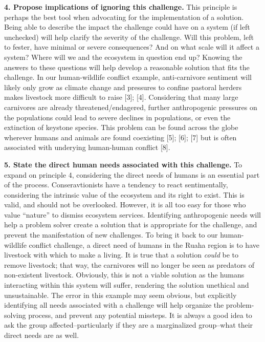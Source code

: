 \documentclass[10pt,letterpaper]{article}
\begin{document}
\textbf{4. Propose implications of ignoring this challenge.} This
principle is perhaps the best tool when advocating for the
implementation of a solution. Being able to describe the impact the
challenge could have on a system (if left unchecked) will help clarify
the severity of the challenge. Will this problem, left to fester, have
minimal or severe consequences? And on what scale will it affect a
system? Where will we and the ecosystem in question end up? Knowing the
answers to these questions will help develop a reasonable solution that
fits the challenge. In our human-wildlife conflict example,
anti-carnivore sentiment will likely only grow as climate change and
pressures to confine pastoral herders makes livestock more difficult to
raise {[}3{]}; {[}4{]}. Considering that many large carnivores are
already threatened/endagered, further anthropogenic pressures on the
populations could lead to severe declines in populations, or even the
extinction of keystone species. This problem can be found across the
globe wherever humans and animals are found coexisting {[}5{]}; {[}6{]};
{[}7{]} but is often associated with underying human-human conflict
{[}8{]}.

\textbf{5. State the direct human needs associated with this challenge.}
To expand on principle 4, considering the direct needs of humans is an
essential part of the process. Conseravtionists have a tendency to react
sentimentally, considering the intrinsic value of the ecosystem and its
right to exist. This is valid, and should not be overlooked. However, it
is all too easy for those who value ``nature'' to dismiss ecosystem
services. Identifying anthropogenic needs will help a problem solver
create a solution that is appropriate for the challenge, and prevent the
manifestation of new challenges. To bring it back to our human-wildlife
conflict challenge, a direct need of humans in the Ruaha region is to
have livestock with which to make a living. It is true that a solution
\emph{could} be to remove livestock; that way, the carnivores will no
longer be seen as predators of non-existent livestock. Obviously, this
is not a viable solution as the humans interacting within this system
will suffer, rendering the solution unethical and unsustainable. The
error in this example may seem obvious, but explicitly identifying all
needs associated with a challenge will help organize the problem-solving
process, and prevent any potential missteps. It is always a good idea to
ask the group affected--particularly if they are a marginalized
group--what their direct needs are as well.
\end{document}
